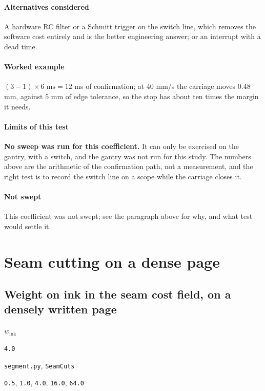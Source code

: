 \paragraph{Alternatives considered}

A hardware RC filter or a Schmitt trigger on the switch line, which removes the software cost entirely and is the better engineering answer; or an interrupt with a dead time.

\paragraph{Worked example}

$(3-1) \times 6\text{ ms} = 12$ ms of confirmation; at $40$ mm/s the carriage moves $0.48$ mm, against $5$ mm of edge tolerance, so the stop has about ten times the margin it needs.

\paragraph{Limits of this test}

\textbf{No sweep was run for this coefficient.} It can only be exercised on the gantry, with a switch, and the gantry was not run for this study. The numbers above are the arithmetic of the confirmation path, not a measurement, and the right test is to record the switch line on a scope while the carriage closes it.

\paragraph{Not swept} This coefficient was not swept; see the paragraph above for why, and what test would settle it.

\section{Seam cutting on a dense page}

\subsection{Weight on ink in the seam cost field, on a densely written page}

\label{coef:seam-ink-weight-dense}

\begin{description}[leftmargin=5.2em,style=sameline]

\item[Symbol] $w_{\text{ink}}$

\item[Value] \texttt{4.0}

\item[Source] \texttt{segment.py}, \texttt{SeamCuts}

\item[Swept] \texttt{0.5}, \texttt{1.0}, \texttt{4.0}, \texttt{16.0}, \texttt{64.0}

\end{description}

